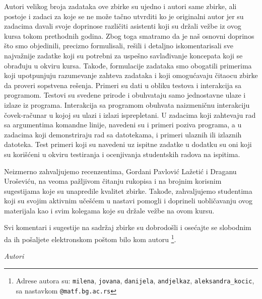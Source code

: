 Autori velikog broja zadataka ove zbirke su ujedno i autori same zbirke, ali postoje 
i zadaci za koje se ne može tačno utvrditi ko je originalni autor jer su zadacima 
davali svoje doprinose različiti asistenti koji su držali vežbe iz ovog kursa 
tokom prethodnih godina. Zbog toga smatramo da je naš osnovni doprinos 
što smo objedinili, precizno formulisali, rešili i detaljno iskomentarisali 
sve najvažnije zadatke koji su potrebni za uspešno savlađivanje koncepata 
koji se obrađuju u okviru kursa. Takođe, formulacije zadataka smo obogatili
primerima koji upotpunjuju razumevanje zahteva zadataka i koji omogućavaju
čitaocu zbirke da proveri sopstvena rešenja. Primeri su dati u obliku 
testova i interakcija sa programom. Testovi su svedene prirode i obuhvataju 
samo jednostavne ulaze i izlaze iz programa. Interakcija sa programom obuhvata 
naizmeničnu interakciju čovek-računar u kojoj su ulazi i izlazi isprepletani. 
U zadacima koji zahtevaju rad sa argumentima komandne linije, navedeni su i primeri poziva programa, a u zadacima koji demonstriraju rad sa datotekama, i primeri ulaznih ili izlaznih datoteka. Test primeri koji su navedeni uz ispitne zadatke u dodatku su oni koji su korišćeni u okviru testiranja i ocenjivanja studentskih radova na ispitima.

Neizmerno zahvaljujemo recenzentima, Gordani Pavlović Lažetić i Draganu Uroševiću, na veoma pažljivom čitanju rukopisa i na brojnim korisnim sugestijama koje su unapredile kvalitet zbirke. Takođe, zahvaljujemo studentima koji su svojim aktivnim učešćem u nastavi pomogli i doprineli uobličavanju ovog materijala kao i svim kolegama koje su držale vežbe na ovom kursu. 

Svi komentari i sugestije na sadržaj zbirke su dobrodošli i osećajte se slobodnim da ih pošaljete elektronskom poštom bilo kom autoru \footnote{Adrese autora su: \texttt{milena}, \texttt{jovana}, \texttt{danijela}, \texttt{andjelkaz}, \texttt{aleksandra\_kocic}, sa nastavkom \texttt{@matf.bg.ac.rs}}. 


\bigskip


\bigskip

\begin{flushright}
{\em Autori}
\end{flushright}